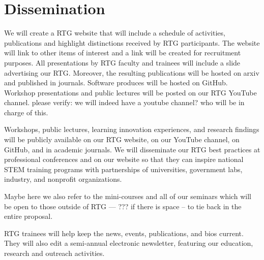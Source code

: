 \documentclass[11pt]{NSFamsart}
\begin{document}
 \section{Dissemination}
 We will create a   RTG website that will include a schedule of activities, publications and highlight
distinctions received by RTG participants. The website will link to other items of interest and a link will
be created for recruitment purposes. All presentations by RTG faculty and trainees  will    include a slide advertising our RTG.
Moreover, the resulting publications   will be hosted on arxiv and published in journals.  Software produces will be hosted on GitHub.  Workshop  presentations and  public lectures will be posted on our RTG YouTube channel. {\color{red}please verify: we will indeed have a youtube channel? who will be in charge of this.}

Workshops, public lectures, learning innovation experiences, and research findings will be publicly available on our  RTG website, on our YouTube channel, on GitHub, and in academic journals. We will disseminate our RTG best practices at professional conferences and on our website so that they can inspire national STEM  training programs with partnerships of universities, government labs, industry, and nonprofit organizations.

{\color{cyan}Maybe here we also refer to the mini-courses and all of our seminars which will be open to those outside of RTG --- ??? if there is space -- to tie back in the entire proposal. }



 

RTG trainees will help keep the news, events, publications, and bios current.  They will also edit a semi-annual electronic newsletter, 
featuring our education, research  and outreach  activities. 

 
\end{document}
